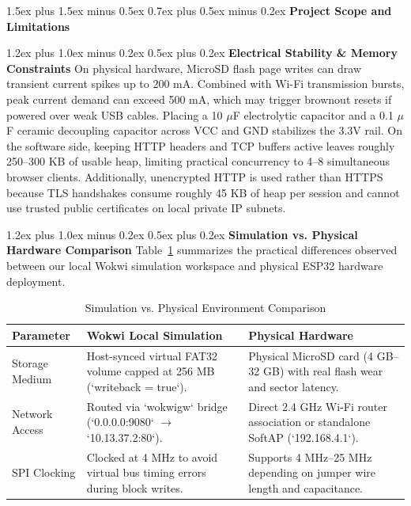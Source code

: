 \documentclass[conference]{IEEEtran}
\makeatletter
\renewcommand\section{\@startsection{section}{1}{\z@}%
  {1.5ex plus 1.5ex minus 0.5ex}%
  {0.7ex plus 0.5ex minus 0.2ex}%
  {\normalfont\normalsize\bfseries\centering}}
\renewcommand\subsection{\@startsection{subsection}{2}{\z@}%
  {1.2ex plus 1.0ex minus 0.2ex}%
  {0.5ex plus 0.2ex}%
  {\normalfont\normalsize\bfseries}}
\makeatother
\begin{document}
\section{\textbf{Project Scope and Limitations}}

\subsection{\textbf{Electrical Stability \& Memory Constraints}}
On physical hardware, MicroSD flash page writes can draw transient current spikes up to 200 mA. Combined with Wi-Fi transmission bursts, peak current demand can exceed 500 mA, which may trigger brownout resets if powered over weak USB cables. Placing a 10 $\mu$F electrolytic capacitor and a 0.1 $\mu$F ceramic decoupling capacitor across VCC and GND stabilizes the 3.3V rail. On the software side, keeping HTTP headers and TCP buffers active leaves roughly 250--300 KB of usable heap, limiting practical concurrency to 4--8 simultaneous browser clients. Additionally, unencrypted HTTP is used rather than HTTPS because TLS handshakes consume roughly 45 KB of heap per session and cannot use trusted public certificates on local private IP subnets.

\subsection{\textbf{Simulation vs. Physical Hardware Comparison}}
Table~\ref{tab:comparison} summarizes the practical differences observed between our local Wokwi simulation workspace and physical ESP32 hardware deployment.

\begin{table}[htbp]
\caption{Simulation vs. Physical Environment Comparison}
\begin{center}
\begin{tabular}{p{2.0cm} p{2.8cm} p{2.8cm}}
\toprule
\textbf{Parameter} & \textbf{Wokwi Local Simulation} & \textbf{Physical Hardware} \\
\midrule
Storage Medium & Host-synced virtual FAT32 volume capped at 256 MB (`writeback = true`). & Physical MicroSD card (4 GB--32 GB) with real flash wear and sector latency. \\
Network Access & Routed via `wokwigw` bridge (`0.0.0.0:9080` $\rightarrow$ `10.13.37.2:80`). & Direct 2.4 GHz Wi-Fi router association or standalone SoftAP (`192.168.4.1`). \\
SPI Clocking & Clocked at 4 MHz to avoid virtual bus timing errors during block writes. & Supports 4 MHz--25 MHz depending on jumper wire length and capacitance. \\
\bottomrule
\end{tabular}
\label{tab:comparison}
\end{center}
\end{table}
\end{document}
